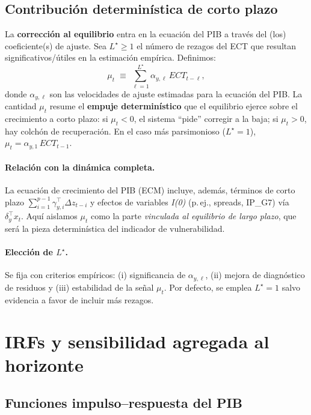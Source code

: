 \documentclass[11pt,a4paper]{article}
\newcommand{\1}{\mathbf{1}}
\begin{document}
\subsection{Contribución determinística de corto plazo}

La \textbf{corrección al equilibrio} entra en la ecuación del PIB a través del (los) coeficiente(s) de ajuste. 
Sea $L^\star \ge 1$ el número de rezagos del ECT que resultan significativos/útiles en la estimación empírica. Definimos:
\begin{equation}
\label{eq:mu_def}
\mu_t 
\;\equiv\;
\sum_{\ell=1}^{L^\star} \alpha_{y,\ell} \, ECT_{t-\ell},
\end{equation}
donde $\alpha_{y,\ell}$ son las velocidades de ajuste estimadas para la ecuación del PIB. 
La cantidad $\mu_t$ resume el \textbf{empuje determinístico} que el equilibrio ejerce sobre el crecimiento a corto plazo: 
si $\mu_t<0$, el sistema ``pide'' corregir a la baja; si $\mu_t>0$, hay colchón de recuperación. 
En el caso más parsimonioso ($L^\star=1$), $\mu_t=\alpha_{y,1}\,ECT_{t-1}$.

\paragraph{Relación con la dinámica completa.}
La ecuación de crecimiento del PIB (ECM) incluye, además, términos de corto plazo $\sum_{i=1}^{p-1} \gamma_{y,i}^\top \Delta z_{t-i}$ y efectos de variables \emph{I(0)} (p.\,ej., spreads, IP\_G7) vía $\delta_y^\top x_t$. 
Aquí aislamos $\mu_t$ como la parte \emph{vinculada al equilibrio de largo plazo}, que será la pieza determinística del indicador de vulnerabilidad.

\paragraph{Elección de $L^\star$.}
Se fija con criterios empíricos:
(i) significancia de $\alpha_{y,\ell}$, 
(ii) mejora de diagnóstico de residuos y 
(iii) estabilidad de la señal $\mu_t$. 
Por defecto, se emplea $L^\star=1$ salvo evidencia a favor de incluir más rezagos.


\section{IRFs y sensibilidad agregada al horizonte}

\subsection{Funciones impulso--respuesta del PIB}
\end{document}
